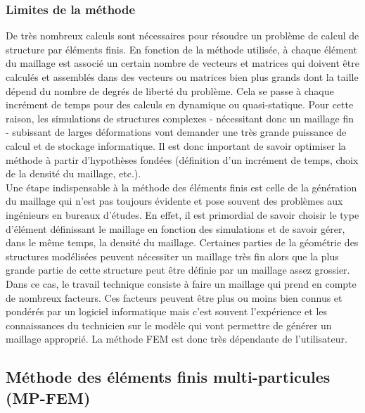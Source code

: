 		\subsubsection{Limites de la méthode}
			De très nombreux calculs sont nécessaires pour résoudre un problème de calcul de structure par éléments finis. En fonction de la méthode utilisée, à chaque élément du maillage est associé un certain nombre de vecteurs et matrices qui doivent être calculés et assemblés dans des vecteurs ou matrices bien plus grands dont la taille dépend du nombre de degrés de liberté du problème. Cela se passe à chaque incrément de temps pour des calculs en dynamique ou quasi-statique. Pour cette raison, les simulations de structures complexes - nécessitant donc un maillage fin - subissant de larges déformations vont demander une très grande puissance de calcul et de stockage informatique. Il est donc important de savoir optimiser la méthode à partir d'hypothèses fondées (définition d'un incrément de temps, choix de la densité du maillage, etc.).
			\\Une étape indispensable à la méthode des éléments finis est celle de la génération du maillage qui n'est pas toujours évidente et pose souvent des problèmes aux ingénieurs en bureaux d'études. En effet, il est primordial de savoir choisir le type d'élément définissant le maillage en fonction des simulations et de savoir gérer, dans le même temps, la densité du maillage. Certaines parties de la géométrie des structures modélisées peuvent nécessiter un maillage très fin alors que la plus grande partie de cette structure peut être définie par un maillage assez grossier. Dans ce cas, le travail technique consiste à faire un maillage qui prend en compte de nombreux facteurs. Ces facteurs peuvent être plus ou moins bien connus et pondérés par un logiciel informatique mais c'est souvent l'expérience et les connaissances du technicien sur le modèle qui vont permettre de générer un maillage approprié. La méthode FEM est donc très dépendante de l'utilisateur.
	\subsection{Méthode des éléments finis multi-particules (MP-FEM)}
		\label{para03:MPFEM}
